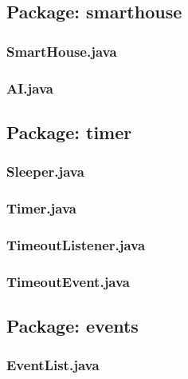 
\subsection{Package: smarthouse}
\subsubsection{SmartHouse.java}

\subsubsection{AI.java}


\subsection{Package: timer}
\subsubsection{Sleeper.java}

\subsubsection{Timer.java}

\subsubsection{TimeoutListener.java}

\subsubsection{TimeoutEvent.java}


\subsection{Package: events}
\subsubsection{EventList.java}

